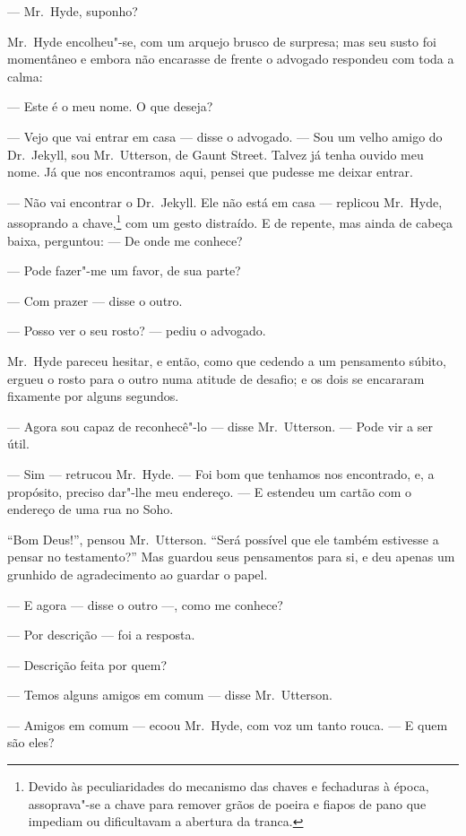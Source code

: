 --- Mr.~Hyde, suponho?

Mr.~Hyde encolheu"-se, com um arquejo brusco de surpresa; mas seu susto
foi momentâneo e embora não encarasse de frente o advogado respondeu
com toda a calma:

--- Este é o meu nome.  O que deseja?

--- Vejo que vai entrar em casa --- disse o advogado. --- Sou um velho amigo
do Dr.~Jekyll, sou Mr.~Utterson, de Gaunt Street.  Talvez já tenha
ouvido meu nome.  Já que nos encontramos aqui, pensei que pudesse me
deixar entrar.

--- Não vai encontrar o Dr.~Jekyll.  Ele não está em casa --- replicou Mr.~Hyde, 
assoprando a chave,\footnote{ Devido às peculiaridades do mecanismo das chaves e fechaduras à época, 
assoprava"-se a chave para remover grãos de poeira e fiapos de pano que 
impediam ou dificultavam a abertura da tranca.} com um gesto distraído. E de repente, mas              
ainda de cabeça baixa, perguntou: --- De onde me conhece? 

--- Pode fazer"-me um favor, de sua parte? 

--- Com prazer --- disse o outro.  

--- Posso ver o seu rosto? --- pediu o advogado.

Mr.~Hyde pareceu hesitar, e então, como que cedendo a um pensamento
súbito, ergueu o rosto para o outro numa atitude de desafio; e os dois
se encararam fixamente por alguns segundos.

--- Agora sou capaz de reconhecê"-lo --- disse Mr.~Utterson. --- Pode vir a
ser útil. 

--- Sim --- retrucou Mr.~Hyde. --- Foi bom que tenhamos nos encontrado, e, a
propósito, preciso dar"-lhe meu endereço. --- E estendeu um cartão com o
endereço de uma rua no Soho.

“Bom Deus!”, pensou Mr.~Utterson. “Será possível que ele também
estivesse a pensar no testamento?”  Mas guardou seus pensamentos para
si, e deu apenas um grunhido de agradecimento ao guardar o papel.

--- E agora --- disse o outro ---, como me conhece?

--- Por descrição --- foi a resposta.

--- Descrição feita por quem?

--- Temos alguns amigos em comum --- disse Mr.~Utterson.

--- Amigos em comum --- ecoou Mr.~Hyde, com voz um tanto rouca. --- E quem
são eles?

